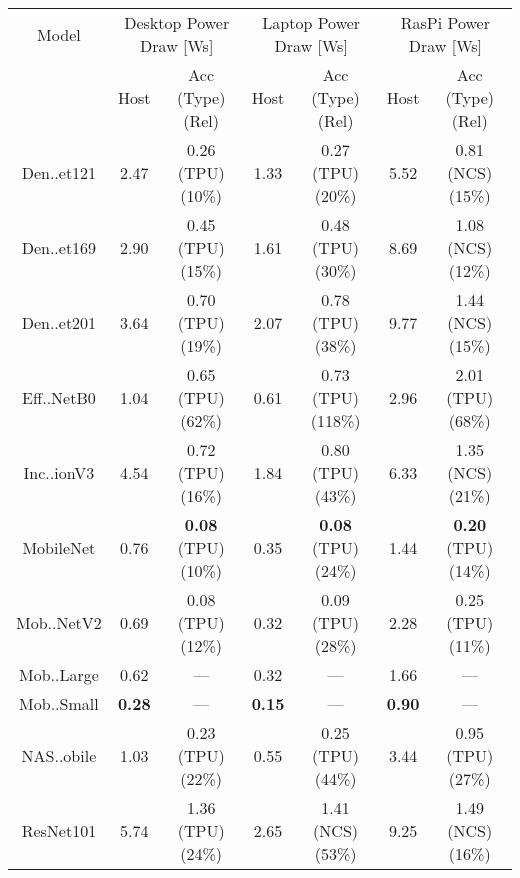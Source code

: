 \begin{tabular}{c|cc|cc|cc}
    Model & \multicolumn{2}{c}{Desktop Power Draw [Ws]} & \multicolumn{2}{c}{Laptop Power Draw [Ws]} & \multicolumn{2}{c}{RasPi Power Draw [Ws]} \\
     & Host & Acc (Type) (Rel) & Host & Acc (Type) (Rel) & Host & Acc (Type) (Rel) \\
     \midrule
    Den..et121 & 2.47 & 0.26 (\colorbox{RC}{TPU}) (\colorbox{RA}{10\%}) & 1.33 & 0.27 (\colorbox{RC}{TPU}) (\colorbox{RC}{20\%}) & 5.52 & 0.81 (\colorbox{RA}{NCS}) (\colorbox{RA}{15\%}) \\
        Den..et169 & 2.90 & 0.45 (\colorbox{RC}{TPU}) (\colorbox{RC}{15\%}) & 1.61 & 0.48 (\colorbox{RC}{TPU}) (\colorbox{RC}{30\%}) & 8.69 & 1.08 (\colorbox{RA}{NCS}) (\colorbox{RA}{12\%}) \\
        Den..et201 & 3.64 & 0.70 (\colorbox{RC}{TPU}) (\colorbox{RC}{19\%}) & 2.07 & 0.78 (\colorbox{RC}{TPU}) (\colorbox{RC}{38\%}) & 9.77 & 1.44 (\colorbox{RA}{NCS}) (\colorbox{RA}{15\%}) \\
        Eff..NetB0 & 1.04 & 0.65 (\colorbox{RC}{TPU}) (\colorbox{RE}{62\%}) & 0.61 & 0.73 (\colorbox{RC}{TPU}) (\colorbox{RE}{118\%}) & 2.96 & 2.01 (\colorbox{RC}{TPU}) (\colorbox{RE}{68\%}) \\
        Inc..ionV3 & 4.54 & 0.72 (\colorbox{RC}{TPU}) (\colorbox{RC}{16\%}) & 1.84 & 0.80 (\colorbox{RC}{TPU}) (\colorbox{RC}{43\%}) & 6.33 & 1.35 (\colorbox{RA}{NCS}) (\colorbox{RC}{21\%}) \\
        MobileNet & 0.76 & \textbf{0.08} (\colorbox{RC}{TPU}) (\colorbox{RA}{10\%}) & 0.35 & \textbf{0.08} (\colorbox{RC}{TPU}) (\colorbox{RC}{24\%}) & 1.44 & \textbf{0.20} (\colorbox{RC}{TPU}) (\colorbox{RA}{14\%}) \\
        Mob..NetV2 & 0.69 & 0.08 (\colorbox{RC}{TPU}) (\colorbox{RA}{12\%}) & 0.32 & 0.09 (\colorbox{RC}{TPU}) (\colorbox{RC}{28\%}) & 2.28 & 0.25 (\colorbox{RC}{TPU}) (\colorbox{RA}{11\%}) \\
        Mob..Large & 0.62 & --- & 0.32 & --- & 1.66 & --- \\
        Mob..Small & \textbf{0.28}  & --- & \textbf{0.15}  & --- & \textbf{0.90}  & --- \\
        NAS..obile & 1.03 & 0.23 (\colorbox{RC}{TPU}) (\colorbox{RC}{22\%}) & 0.55 & 0.25 (\colorbox{RC}{TPU}) (\colorbox{RC}{44\%}) & 3.44 & 0.95 (\colorbox{RC}{TPU}) (\colorbox{RC}{27\%}) \\
        ResNet101 & 5.74 & 1.36 (\colorbox{RC}{TPU}) (\colorbox{RC}{24\%}) & 2.65 & 1.41 (\colorbox{RA}{NCS}) (\colorbox{RC}{53\%}) & 9.25 & 1.49 (\colorbox{RA}{NCS}) (\colorbox{RC}{16\%}) \\

\end{tabular}
